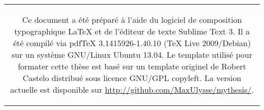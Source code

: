 \singlespacing

	\begin{center}
		\begin{tabular}{c}
				\begin{minipage}[][4cm][c]{0.8\linewidth}
					\begin{tcolorbox}[colback=black!5!white,colframe=black!75!black]
						\sffamily
						Ce document a été préparé à l'aide du logiciel de composition typographique {\LaTeX} et de l'éditeur de texte Sublime Text 3. Il a été compilé via pdfTeX 3.1415926-1.40.10 (TeX Live 2009/Debian) sur un système GNU/Linux Ubuntu 13.04. Le template utilisé pour formater cette thèse est basé sur un template originel de Robert Castelo distribué sous licence GNU/GPL copyleft. La version actuelle est disponible sur \url{http://github.com/MaxUlysse/mythesis/}.
					\end{tcolorbox}
				\end{minipage}
		\end{tabular}
	\end{center}
